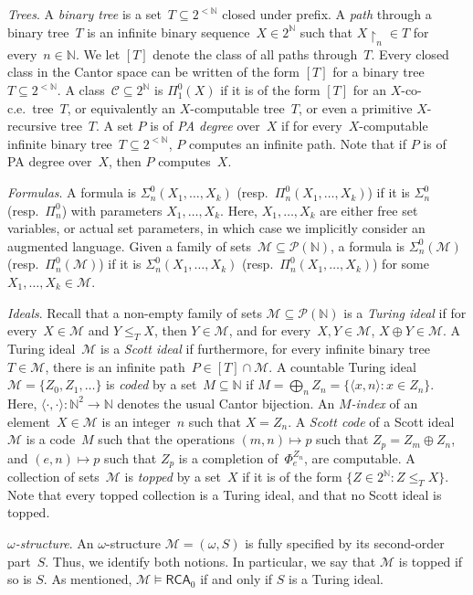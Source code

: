 \documentclass{article}
\def\NN{\mathbb{N}}
\def\C{\mathcal{C}}
\def\P{\mathcal{P}}
\def\M{\mathcal{M}}
\newcommand{\cs}{2^{\NN}}
\newcommand{\uh}{\upharpoonright}
\newcommand{\RCA}{\mathsf{RCA}}
\numberwithin{theorem}{section}
\theoremstyle{definition}
\begin{document}
\emph{Trees}. A \emph{binary tree} is a set~$T \subseteq 2^{<\NN}$ closed under prefix. A \emph{path} through a binary tree~$T$ is an infinite binary sequence~$X \in 2^\NN$ such that $X \uh_n \in T$ for every~$n \in \NN$. We let $[T]$ denote the class of all paths through~$T$. Every closed class in the Cantor space can be written of the form $[T]$ for a binary tree~$T \subseteq 2^{<\NN}$. A class~$\C \subseteq 2^\NN$ is \emph{$\Pi^0_1(X)$} if it is of the form $[T]$ for an $X$-co-c.e.\ tree~$T$, or equivalently an $X$-computable tree~$T$, or even a primitive $X$-recursive tree~$T$. A set $P$ is of \emph{PA degree} over~$X$ if for every~$X$-computable infinite binary tree~$T \subseteq 2^{<\NN}$, $P$ computes an infinite path. Note that if $P$ is of PA degree over~$X$, then $P$ computes~$X$.

\emph{Formulas}.
A formula is $\Sigma^0_n(X_1, \dots, X_k)$ (resp.\ $\Pi^0_n(X_1, \dots, X_k)$) if it is $\Sigma^0_n$ (resp.\ $\Pi^0_n$) with parameters $X_1, \dots, X_k$. Here, $X_1, \dots, X_k$ are either free set variables, or actual set parameters, in which case we implicitly consider an augmented language.
Given a family of sets~$\M \subseteq \P(\NN)$, a formula is $\Sigma^0_n(\M)$ (resp.\ $\Pi^0_n(\M)$) if it is $\Sigma^0_n(X_1, \dots, X_k)$ (resp.\ $\Pi^0_n(X_1, \dots, X_k)$) for some~$X_1, \dots, X_k \in \M$.

\emph{Ideals}.
Recall that a non-empty family of sets $\M \subseteq \P(\NN)$ is a \emph{Turing ideal} if for every~$X \in \M$ and $Y \leq_T X$, then $Y \in \M$, and for every~$X, Y \in \M$, $X \oplus Y \in \M$. A Turing ideal~$\M$ is a \emph{Scott ideal} if furthermore, for every infinite binary tree~$T \in \M$, there is an infinite path~$P \in [T] \cap \M$.
A countable Turing ideal~$\M = \{Z_0, Z_1, \dots\}$ is \emph{coded} by a set~$M \subseteq \NN$ if $M = \bigoplus_n Z_n = \{ \langle x, n \rangle : x \in Z_n \}$. Here, $\langle \cdot, \cdot \rangle : \NN^2 \to \NN$ denotes the usual Cantor bijection. An \emph{$M$-index} of an element~$X \in \M$ is an integer~$n$ such that $X = Z_n$. A \emph{Scott code} of a Scott ideal~$\M$ is a code~$M$ such that the operations $(m, n) \mapsto p$ such that $Z_p = Z_m \oplus Z_n$, and $(e, n) \mapsto p$ such that $Z_p$ is a completion of~$\Phi_e^{Z_n}$, are computable. A collection of sets~$\M$ is \emph{topped} by a set~$X$ if it is of the form $\{ Z \in \cs : Z \leq_T X \}$. Note that every topped collection is a Turing ideal, and that no Scott ideal is topped. 

\emph{$\omega$-structure}. An $\omega$-structure $\M = (\omega, S)$ is fully specified by its second-order part~$S$. Thus, we identify both notions. In particular, we say that $\M$ is topped if so is $S$. As mentioned, $\M \models \RCA_0$ if and only if $S$ is a Turing ideal.
\end{document}
